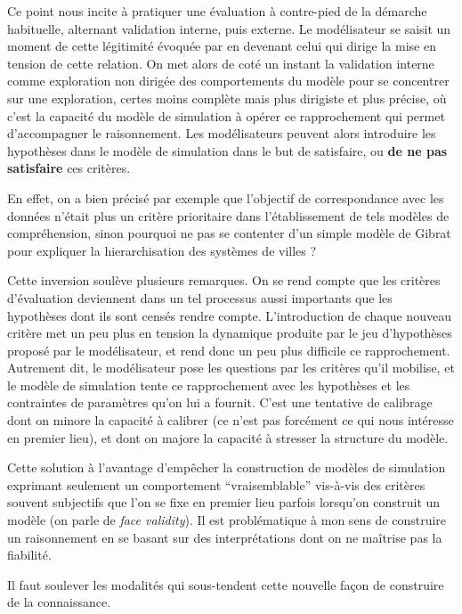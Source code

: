 Ce point nous incite à pratiquer une évaluation à contre-pied de la démarche habituelle, alternant validation interne, puis externe. Le modélisateur se saisit un moment de cette légitimité évoquée par \textcite{Bulle2005} en devenant celui qui dirige la mise en tension de cette relation. On met alors de coté un instant la validation interne comme exploration non dirigée des comportements du modèle pour se concentrer sur une exploration, certes moins complète mais plus dirigiste et plus précise, où c'est la capacité du modèle de simulation à opérer ce rapprochement qui permet d'accompagner le raisonnement. Les modélisateurs peuvent alors introduire les hypothèses dans le modèle de simulation dans le but de satisfaire, ou \textbf{de ne pas satisfaire} ces critères.

En effet, on a bien précisé par exemple que l'objectif de correspondance avec les données n'était plus un critère prioritaire dans l'établissement de tels modèles de compréhension, sinon pourquoi ne pas se contenter d'un simple modèle de Gibrat pour expliquer la hierarchisation des systèmes de villes ?

Cette inversion soulève plusieurs remarques. On se rend compte que les critères d'évaluation deviennent dans un tel processus aussi importants que les hypothèses dont ils sont censés rendre compte. L'introduction de chaque nouveau critère met un peu plus en tension la dynamique produite par le jeu d'hypothèses proposé par le modélisateur, et rend donc un peu plus difficile ce rapprochement. Autrement dit, le modélisateur pose les questions par les critères qu'il mobilise, et le modèle de simulation tente ce rapprochement avec les hypothèses et les contraintes de paramètres qu'on lui a fournit. C'est une tentative de calibrage dont on minore la capacité à calibrer (ce n'est pas forcément ce qui nous intéresse en premier lieu), et dont on majore la capacité à stresser la structure du modèle.

Cette solution à l'avantage d'empêcher la construction de modèles de simulation exprimant seulement un comportement \enquote{vraisemblable} vis-à-vis des critères souvent subjectifs que l'on se fixe en premier lieu parfois lorsqu'on construit un modèle (on parle de \textit{face validity}). Il est problématique à mon sens de construire un raisonnement en se basant sur des interprétations dont on ne maîtrise pas la fiabilité.

Il faut soulever les modalités qui sous-tendent cette nouvelle façon de construire de la connaissance.

